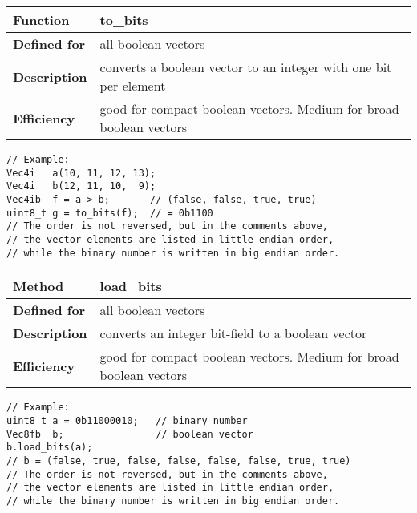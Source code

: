 \documentclass[vcl_manual.tex]{subfiles}
\begin{document}
\begin{tabular}{|p{30mm}|p{120mm}|}
\hline
\bfseries Function & to\_bits \\ \hline
\bfseries Defined for & all boolean vectors \\ \hline
\bfseries Description & converts a boolean vector to an integer with one bit per element \\ \hline
\bfseries Efficiency & good for compact boolean vectors. Medium for broad boolean vectors \\ \hline
\end{tabular}
\begin{lstlisting}[frame=none]
// Example:
Vec4i   a(10, 11, 12, 13);
Vec4i   b(12, 11, 10,  9);
Vec4ib  f = a > b;       // (false, false, true, true)
uint8_t g = to_bits(f);  // = 0b1100
// The order is not reversed, but in the comments above, 
// the vector elements are listed in little endian order, 
// while the binary number is written in big endian order.
\end{lstlisting}


\begin{tabular}{|p{30mm}|p{120mm}|}
\hline
\bfseries Method & load\_bits \\ \hline
\bfseries Defined for & all boolean vectors \\ \hline
\bfseries Description & converts an integer bit-field to a boolean vector \\ \hline
\bfseries Efficiency & good for compact boolean vectors. Medium for broad boolean vectors \\ \hline
\end{tabular}
\begin{lstlisting}[frame=none]
// Example:
uint8_t a = 0b11000010;   // binary number
Vec8fb  b;                // boolean vector
b.load_bits(a);
// b = (false, true, false, false, false, false, true, true)
// The order is not reversed, but in the comments above, 
// the vector elements are listed in little endian order, 
// while the binary number is written in big endian order.
\end{lstlisting}
\end{document}
